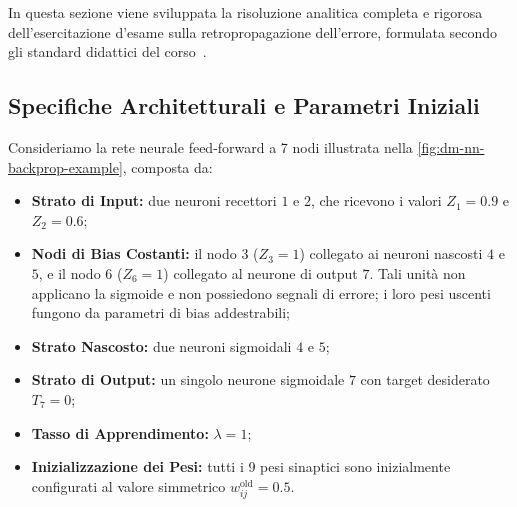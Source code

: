 In questa sezione viene sviluppata la risoluzione analitica completa e rigorosa dell'esercitazione d'esame sulla retropropagazione dell'errore, formulata secondo gli standard didattici del corso~\cite{mannocci2026}.

\FloatBarrier
\subsection{Specifiche Architetturali e Parametri Iniziali}
\label{subsec:dm-exercise-specs}

Consideriamo la rete neurale feed-forward a 7 nodi illustrata nella \autoref{fig:dm-nn-backprop-example}, composta da:
\begin{itemize}
    \item \textbf{Strato di Input:} due neuroni recettori $1$ e $2$, che ricevono i valori $Z_1 = 0.9$ e $Z_2 = 0.6$;
    \item \textbf{Nodi di Bias Costanti:} il nodo $3$ ($Z_3 = 1$) collegato ai neuroni nascosti $4$ e $5$, e il nodo $6$ ($Z_6 = 1$) collegato al neurone di output $7$. Tali unità non applicano la sigmoide e non possiedono segnali di errore; i loro pesi uscenti fungono da parametri di bias addestrabili;
    \item \textbf{Strato Nascosto:} due neuroni sigmoidali $4$ e $5$;
    \item \textbf{Strato di Output:} un singolo neurone sigmoidale $7$ con target desiderato $T_7 = 0$;
    \item \textbf{Tasso di Apprendimento:} $\lambda = 1$;
    \item \textbf{Inizializzazione dei Pesi:} tutti i 9 pesi sinaptici sono inizialmente configurati al valore simmetrico $w_{ij}^{\text{old}} = 0.5$.
\end{itemize}

